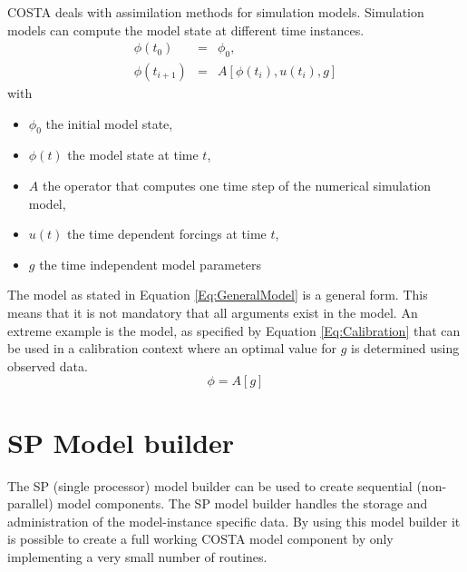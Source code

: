 COSTA deals with assimilation methods for simulation models. Simulation models
can compute the model state at different time instances. 
\begin{eqnarray}\label{Eq:GeneralModel}
\phi \left( t_0 \right) &=& \phi_0, \nonumber \\
\phi\left( t_{i+1} \right) &=& 
 A \left[ \phi \left(t_i\right), u \left( t_i \right), g\right]
\end{eqnarray}
with
\begin{itemize}
\item $\phi_0$ the initial model state,
\item $\phi\left(t\right)$ the model state at time $t$,
\item $A$ the operator that computes one time step of the numerical
      simulation model,
\item $u\left(t\right)$ the time dependent forcings at
      time $t$,
\item $g$ the time independent model parameters
\end{itemize}

The model as stated in Equation \ref{Eq:GeneralModel} is a general form.
This means that it is not mandatory that all arguments exist in the model.
An extreme example is the model, as specified by Equation
\ref{Eq:Calibration} that can be used in a calibration context where an
optimal value for $g$ is determined using observed data.
\begin{equation}\label{Eq:Calibration}
\phi = A \left[g\right]
\end{equation}

\section{SP Model builder}
The SP (single processor) model builder can be used to create
sequential (non-parallel) model components. The SP model builder handles the
storage and administration of the model-instance specific data. By using
this model builder it is possible to create a full working COSTA model
component by only implementing a very small number of routines.

